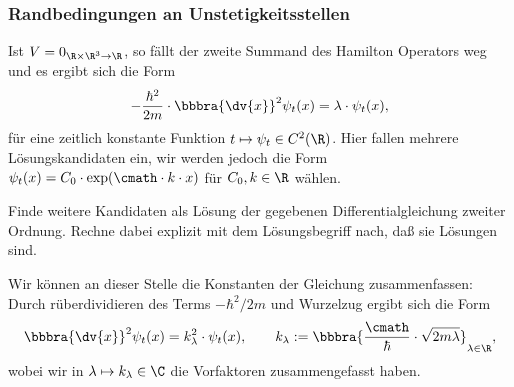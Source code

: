 \documentclass{subfiles}
\begin{document}
    \subsubsection*{Randbedingungen an Unstetigkeitsstellen}
        Ist $V = 0_{\R\times\R^3\to\R}$, so fällt der zweite Summand des Hamilton Operators weg und es ergibt sich die Form
        \[-\frac{\hbar^2}{2m}\cdot\bbbra{\dv{x}}^2\psi_t(x) = \lambda\cdot\psi_t(x),\]
        für eine zeitlich konstante Funktion $t\mapsto \psi_t\in C^2(\R)$. Hier fallen mehrere Lösungskandidaten ein, wir werden jedoch die Form $\psi_t(x) = C_0\cdot{\exp}(\cmath\cdot k\cdot x)$ für $C_0,k\in\R$ wählen.
        \begin{Aufgabe}
            \nr{} Finde weitere Kandidaten als Lösung der gegebenen Differentialgleichung zweiter Ordnung. Rechne dabei explizit mit dem Lösungsbegriff nach, daß sie Lösungen sind. 
        \end{Aufgabe}
        Wir können an dieser Stelle die Konstanten der Gleichung zusammenfassen: Durch rüberdividieren des Terms $-\hbar^2/2m$ und Wurzelzug ergibt sich die Form
        \[\bbbra{\dv{x}}^2\psi_t(x) = k_\lambda^2\cdot \psi_t(x),\qquad k_\lambda:=\bbbra{\frac{\cmath}{\hbar}\cdot\sqrt{2m\lambda}}_{\lambda\in\R},\]
        wobei wir in $\lambda\mapsto k_\lambda\in\C$ die Vorfaktoren zusammengefasst haben. 
\end{document}
